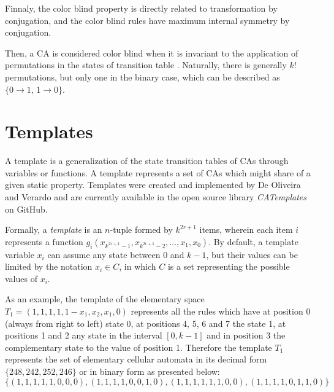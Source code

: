 \documentclass{llncs}
\begin{document}
Finnaly, the color blind property is directly related to transformation by conjugation, and the color blind rules have maximum internal symmetry by conjugation.

Then, a CA is considered color blind when it is invariant to the application of permutations in the states of transition table \cite{salo2013color}. Naturally, there is generally $k!$ permutations, but only one in the binary case, which can be described as $\{0 \to 1 ,\, 1 \to 0\}$.

\section{Templates}
\label{sec:templates}
A template is a generalization of the state transition tables of CAs through variables or functions. A template represents a set of CAs which might share of a given static property. Templates were created and implemented by De Oliveira and Verardo \cite{deOliveira2014} and are currently available in the open source library \textit{CATemplates} \cite{CATemplates} on GitHub.

Formally, a \textit{template} is an $n$-tuple formed by $k^{2r+1}$ items, wherein each item $i$ represents a function $g_i(x_{k^{2r+1}-1},x_{k^{2r+1}-2},\dots,x_1,x_0)$. By default, a template variable $x_i$ can assume any state between 0 and $k-1$, but their values can be limited by the notation $x_i \in C$, in which $C$ is a set representing the possible values of $x_i$. %

As an example, the template of the elementary space $T_1 = (1,1,1,1,1-x_1,x_2,x_1,0)$ represents all the rules which have at position 0 (always from right to left) state 0, at positions 4, 5, 6 and 7 the state 1, at positions 1 and 2 any state in the interval $ [0, k-1] $ and in position 3 the complementary state to the value of position 1. Therefore the template $T_1$ represents the set of elementary cellular automata in its decimal form $\{248,242,252,246\}$ or in binary form as presented below:
\begin{displaymath}
\{(1,1,1,1,1,0,0,0),(1,1,1,1,0,0,1,0),(1,1,1,1,1,1,0,0),(1,1,1,1,0,1,1,0)\}
\end{displaymath}
\end{document}
